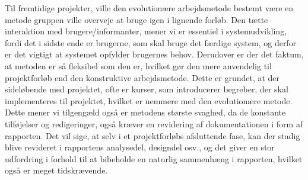 Til fremtidige projekter, ville den evolutionære arbejdsmetode bestemt være en metode gruppen ville overveje at bruge igen i lignende forløb. Den tætte interaktion med brugere/informanter, mener vi er essentiel i systemudvikling, fordi det i sidste ende er brugerne, som skal bruge det færdige system, og derfor er det vigtigt at systemet opfylder brugernes behov. Derudover er der det faktum, at metoden er så fleksibel som den er, hvilket gør den mere anvendelig til projektforløb end den konstruktive arbejdsmetode. Dette er grundet, at der sideløbende med projektet, ofte er kurser, som introducerer begreber, der skal implementeres til projektet, hvilket er nemmere med den evolutionære metode. Dette mener vi tilgengæld også er metodens største svaghed, da de konstante tilføjelser og redigeringer, også kræver en revidering af dokumentationen i form af rapporten. Det vil sige, at selv i et projektforløbs afsluttende fase, kan der stadig blive revideret i rapportens analysedel, designdel osv., og det giver en stor udfordring i forhold til at bibeholde en naturlig sammenhæng i rapporten, hvilket også er meget tidskrævende.



